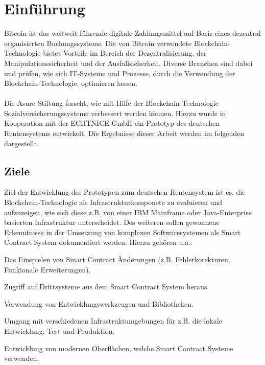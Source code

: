 \section{Einführung}
Bitcoin ist das weltweit führende digitale Zahlungsmittel auf Basis eines dezentral organisierten Buchungssystems. Die von Bitcoin verwendete Blockchain-Technologie bietet Vorteile im Bereich der Dezentralisierung, der Manipulationssicherheit und der Ausfallsicherheit. Diverse Branchen sind dabei und prüfen, wie sich IT-Systeme und Prozesse, durch die Verwendung der Blockchain-Technologie, optimieren lassen.

\paragraph*{}
Die Asure Stiftung forscht, wie mit Hilfe der Blockchain-Technologie Sozialversicherungssysteme verbessert werden können. Hierzu wurde in Kooperation mit der ECHTNICE GmbH ein Prototyp des deutschen Rentensystems entwickelt. Die Ergebnisse dieser Arbeit werden im folgenden dargestellt.

\subsection{Ziele}

Ziel der Entwicklung des Prototypen zum deutschen Rentensystem ist es, die Blockchain-Technologie als Infrastrukturkomponete zu evaluieren und aufzuzeigen, wie sich diese z.B. von einer IBM Mainframe oder Java-Enterprise basierten Infrastruktur unterscheidet. Des weiteren sollen gewonnene Erkenntnisse in der Umsetzung von komplexen Softwaresystemen als Smart Contract System dokumentiert werden. Hierzu gehören u.a.:

\begin{compactenum}
\item Das Einspielen von Smart Contract Änderungen (z.B. Fehlerkorekturen, Funkionale Erweiterungen).
\item Zugriff auf Drittsysteme aus dem Smart Contract System heraus.
\item Verwendung von Entwicklungswerkzeugen und Bibliotheken.
\item Umgang mit verschiedenen Infrastruktumgebungen für z.B. die lokale Entwicklung, Test und Produktion.
\item Entwicklung von modernen Oberflächen, welche Smart Contract Systeme verwenden.
\end{compactenum}

